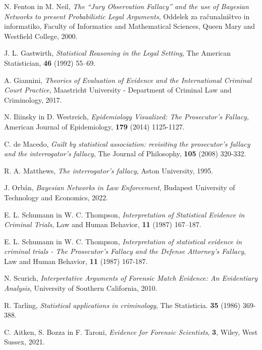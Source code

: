 \documentclass[mat1, tisk]{fmfdelo}
\theoremstyle{definition} %
\theoremstyle{trditev} %
\theoremstyle{izrek}
\begin{document}
\begin{thebibliography}{99}
        N. Fenton in M. Neil, \emph{The “Jury Observation Fallacy” and the use of Bayesian Networks to present Probabilistic Legal Arguments}, Oddelek za računalništvo in informatiko, Faculty of Informatics and Mathematical Sciences, Queen Mary and Westfield College, 2000.

        J. L. Gastwirth, \emph{Statistical Reasoning in the Legal Setting}, The American Statistician, \textbf{46} (1992) 55–69.

        A. Giannini, \emph{Theories of Evaluation of Evidence and the International Criminal Court Practice}, Maastricht University - Department of Criminal Law and Criminology, 2017.

        N. Iliinsky in D. Westreich, \emph{Epidemiology Visualized: The Prosecutor’s Fallacy}, American Journal of Epidemiology, \textbf{179} (2014) 1125-1127.

        C. de Macedo, \emph{Guilt by statistical association: revisiting the prosecutor’s fallacy and the interrogator’s fallacy}, The Journal of Philosophy, \textbf{105} (2008) 320-332.

        R. A. Matthews, \emph{The interrogator’s fallacy}, Aston University, 1995.

        J. Orbán, \emph{Bayesian Networks in Law Enforcement}, Budapest University of Technology and Economics, 2022.

        E. L. Schumann in W. C. Thompson, \emph{Interpretation of Statistical Evidence in Criminal Trials}, Law and Human Behavior, \textbf{11} (1987) 167–187.

        E. L. Schumann in W. C. Thompson, \emph{Interpretation of statistical evidence in criminal trials - The Prosecutor's Fallacy and the Defense Attorney's Fallacy}, Law and Human Behavior, \textbf{11} (1987) 167-187.

        N. Scurich, \emph{Interpretative Arguments of Forensic Match Evidence: An Evidentiary Analysis}, University of Southern California, 2010.

        R. Tarling, \emph{Statistical applications in criminology}, The Statisticia. \textbf{35} (1986) 369-388.

        C. Aitken, S. Bozza in F. Taroni, \emph{Evidence for Forensic Scientists}, \textbf{3}, Wiley, West Sussex, 2021.


\end{thebibliography}
\end{document}
